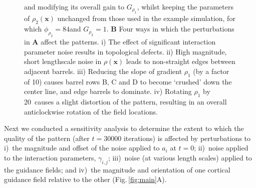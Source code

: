 \documentclass[9pt,lineno]{elife}
\newcommand{\cmnt}[1]{\textcolor{colcmnt}{#1}}
\newcommand{\mb}[1]{\mathbf{#1}}
\begin{document}
\begin{figure}
\begin{fullwidth}
{{        and modifying its overall gain to $G_{\rho_1}$, whilst keeping the
        parameters of $\rho_2(\mb{x})$ unchanged from those used in the
        example simulation, for which $\phi_{\rho_2}=84$\textdegree and
        $G_{\rho_2}=1$.
        \textbf{B} Four ways in which the perturbations in \textbf{A} affect
        the patterns. i) The effect of significant interaction parameter noise
        results in topological defects. ii) High magnitude, short lengthscale
        noise in $\rho(\mb{x})$ leads to non-straight edges between adjacent
        barrels. iii) Reducing the slope of gradient $\rho_1$ (by a factor of
        10) causes barrel rows B, C and D to become `crushed' down the center
        line, and edge barrels to dominate. iv) Rotating $\rho_1$ by
        20\textdegree~causes a slight distortion of the pattern, resulting in
        an overall anticlockwise rotation of the field locations. }}
    \label{fig:sens}
  \end{fullwidth}
\end{figure}


\cmnt{Next we conducted a sensitivity analysis to determine the extent
  to which the quality of the pattern (after $t=30000$ iterations) is affected
  by perturbations to i)~the magnitude and offset of the noise applied to
  $a_i$ at $t=0$; ii)~noise applied to the interaction parameters,
  $\gamma_{i,j}$; iii)~noise (at various length scales) applied to the
  guidance fields; and iv)~the magnitude and orientation of one cortical
  guidance field relative to the other (Fig.\,\ref{fig:main}A).}
\end{document}
